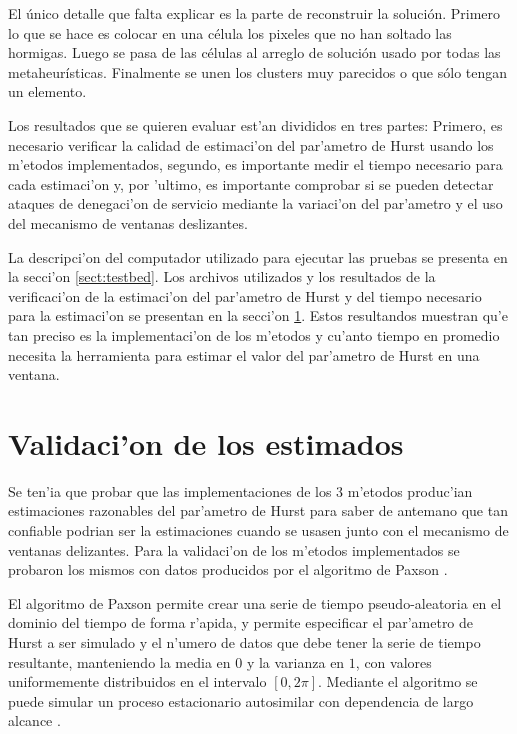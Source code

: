 El \'unico detalle que falta explicar es la parte de reconstruir la soluci\'on.
Primero lo que se hace es colocar en una c\'elula los pixeles
que no han soltado las hormigas. Luego se pasa de las c\'elulas al 
arreglo de soluci\'on usado por todas las metaheur\'isticas. Finalmente
se unen los clusters muy parecidos o que s\'olo tengan un elemento.

Los resultados que se quieren evaluar est'an divididos en tres partes: 
Primero, es necesario verificar la calidad de estimaci'on del par'ametro
de Hurst usando los m'etodos implementados, segundo, es importante medir 
el tiempo necesario para cada estimaci'on y, por 'ultimo, es importante
comprobar si se pueden detectar ataques de denegaci'on de servicio mediante la
variaci'on del par'ametro y el uso del mecanismo de ventanas deslizantes.

La descripci'on del computador utilizado para ejecutar las pruebas se 
presenta en la secci'on \ref{sect:testbed}. Los archivos utilizados y los
resultados de la verificaci'on de la estimaci'on del par'ametro de Hurst y del
tiempo necesario para la estimaci'on se presentan en la secci'on
\ref{sect:validacion}. Estos resultandos muestran qu'e tan
preciso es la implementaci'on de los m'etodos y cu'anto tiempo en promedio
necesita la herramienta para estimar el valor del par'ametro de Hurst en una
ventana. 

\section{Validaci'on de los estimados} \label{sect:validacion}

Se ten'ia que probar que las implementaciones de los 3 m'etodos produc'ian
estimaciones razonables del par'ametro de Hurst para saber de antemano que tan
confiable podrian ser la estimaciones cuando se usasen junto con el mecanismo
de ventanas delizantes. Para la validaci'on de los m'etodos implementados se
probaron los mismos con datos producidos por el algoritmo de Paxson
\cite{Paxson95fastapproximation}.

El algoritmo de Paxson permite crear una serie de tiempo pseudo-aleatoria en
el dominio del tiempo de forma r'apida, y permite especificar el par'ametro de
Hurst a ser simulado y el n'umero de datos que debe tener la serie de tiempo
resultante, manteniendo la media en $0$ y la varianza en $1$, con valores
uniformemente distribuidos en el intervalo $[0,2\pi]$. Mediante el algoritmo
se puede simular un proceso estacionario autosimilar con dependencia de largo
alcance \cite{Paxson95fastapproximation}.


